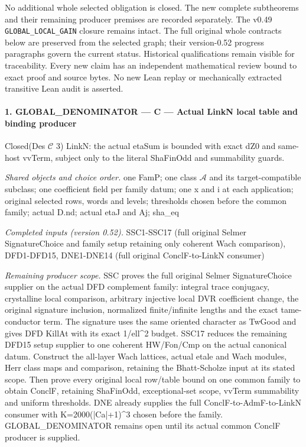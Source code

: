 No additional whole selected obligation is closed. The new complete
subtheorems and their remaining producer premises are recorded
separately. The v0.49 \texttt{GLOBAL\_\allowbreak LOCAL\_\allowbreak GAIN} closure
remains intact. The full original whole contracts below are preserved
from the selected graph; their version-0.52 progress paragraphs
govern the current status. Historical qualifications remain visible
for traceability. Every new claim has an independent mathematical
review bound to exact proof and source bytes. No new Lean replay
or mechanically extracted transitive Lean audit is asserted.
\paragraph{1. GLOBAL\_\allowbreak DENOMINATOR — C — Actual LinkN local table and binding producer}

Closed(Des $\mathcal C$ 3) LinkN: the actual etaSum is bounded with exact dZ0 and same-host vvTerm, subject only to the literal ShaFinOdd and summability guards.

\emph{Shared objects and choice order.} one FamP; one class $\mathcal A$ and its target-compatible subclass; one coefficient field per family datum; one x and i at each application; original selected rows, words and levels; thresholds chosen before the common family; actual D.nd; actual etaJ and Aj; sha\_\allowbreak eq

\emph{Completed inputs (version 0.52).} SSC1-SSC17 (full original Selmer SignatureChoice and family setup retaining only coherent Wach comparison), DFD1-DFD15, DNE1-DNE14 (full original ConclF-to-LinkN consumer)

\emph{Remaining producer scope.} SSC proves the full original Selmer SignatureChoice supplier on the actual DFD complement family: integral trace conjugacy, crystalline local comparison, arbitrary injective local DVR coefficient change, the original signature inclusion, normalized finite/infinite lengths and the exact tame-conductor term. The signature uses the same oriented character as TwGood and gives DFD KillAt with its exact 1/ell\textasciicircum{}2 budget. SSC17 reduces the remaining DFD15 setup supplier to one coherent HW/Fon/Cmp on the actual canonical datum. Construct the all-layer Wach lattices, actual etale and Wach modules, Herr class maps and comparison, retaining the Bhatt-Scholze input at its stated scope. Then prove every original local row/table bound on one common family to obtain ConclF, retaining ShaFinOdd, exceptional-set scope, vvTerm summability and uniform thresholds. DNE already supplies the full ConclF-to-AdmF-to-LinkN consumer with K=2000(|Ca|+1)\textasciicircum{}3 chosen before the family. GLOBAL\_\allowbreak DENOMINATOR remains open until its actual common ConclF producer is supplied.


